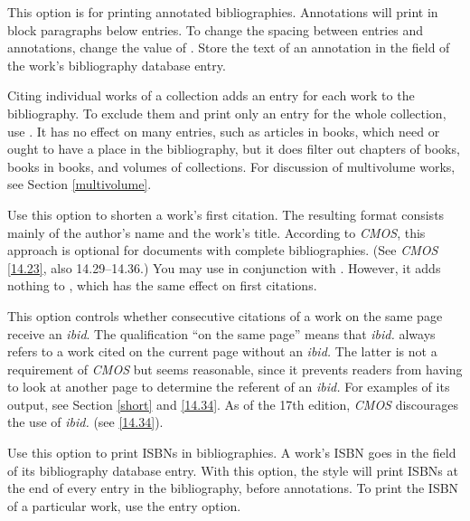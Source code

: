 \documentclass[11pt,letterpaper,oneside]{article}
\begin{document}
\begin{optionlist}


\noindent This option is for printing annotated bibliographies.
Annotations will print in block paragraphs below entries. To change
the spacing between entries and annotations, change the value of
. Store the text of an annotation in the
 field of the work's bibliography database entry.


\noindent Citing individual works of a collection adds an entry for
each work to the bibliography. To exclude them and print only an entry
for the whole collection, use . It has no effect on
many  entries, such as articles in books, which
need or ought to have a place in the bibliography, but it does filter
out chapters of books, books in books, and volumes of collections. For
discussion of multivolume works, see Section \ref{multivolume}.


\noindent Use this option to shorten a work's first citation. The
resulting format consists mainly of the author's name and the work's
title. According to \textit{CMOS}, this approach is optional for
documents with complete bibliographies. (See \textit{CMOS}
\ref{14.23}, also 14.29--14.36.) You may use  in
conjunction with . However, it adds nothing to ,
which has the same effect on first citations.


\noindent This option controls whether consecutive citations of a work
on the same page receive an \textit{ibid}. The qualification ``on the
same page'' means that \textit{ibid.} always refers to a work cited on
the current page without an \textit{ibid.} The latter is not a
requirement of \textit{CMOS} but seems reasonable, since it prevents
readers from having to look at another page to determine the referent
of an \textit{ibid.} For examples of its output, see Section
\ref{short} and \ref{14.34}. As of the 17th edition, \textit{CMOS}
discourages the use of \textit{ibid.} (see \ref{14.34}).


\noindent Use this option to print ISBNs in bibliographies. A work's
ISBN goes in the  field of its bibliography database
entry. With this option, the style will print ISBNs at the end of
every entry in the bibliography, before annotations. To print the ISBN
of a particular work, use the  entry option.


\end{optionlist}
\end{document}
